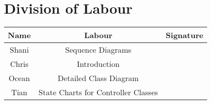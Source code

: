 \documentclass[]{article}
\begin{document}
\appendix
\section{Division of Labour}
\label{sec:division_of_labour}
\begin{center}
\begin{tabular}{ |c|c|c| }
 \hline
 Name & Labour & Signature \\ \hline
 Shani & Sequence Diagrams & \\
 Chris & Introduction  &  \\
 Ocean &  Detailed Class Diagram &  \\
 Tian & State Charts for Controller Classes & \\
 \hline
\end{tabular}
\end{center}
\end{document}
